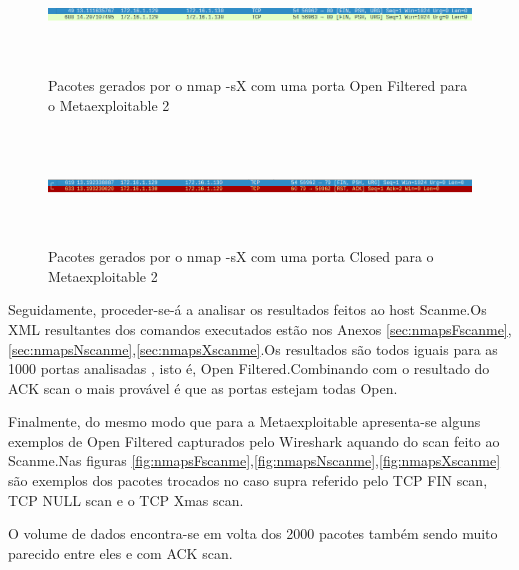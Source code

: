 \begin{figure}[h!]
	\centering
		
	\includegraphics[width=\textwidth,height=3cm,keepaspectratio]{images/nmapsXmetaOF.png}
		
	\caption{Pacotes gerados por o nmap -sX com uma porta Open Filtered para o Metaexploitable 2}
		
	\label{fig:nmapsXmetaOF}
\end{figure}

\begin{figure}[h!]
	\centering
		
	\includegraphics[width=\textwidth,height=3cm,keepaspectratio]{images/nmapsXmetaC.png}
		
	\caption{Pacotes gerados por o nmap -sX com uma porta Closed para o Metaexploitable 2}
		
	\label{fig:nmapsXmetaC}
\end{figure}

Seguidamente, proceder-se-á a analisar os resultados feitos ao host Scanme.Os XML resultantes dos comandos executados estão nos Anexos \ref{sec:nmapsFscanme},\ref{sec:nmapsNscanme},\ref{sec:nmapsXscanme}.Os resultados são todos iguais para as 1000 portas analisadas , isto é, Open Filtered.Combinando com o resultado do ACK scan o mais provável é que as portas estejam todas Open.

Finalmente, do mesmo modo que para a Metaexploitable apresenta-se alguns exemplos de Open Filtered capturados pelo Wireshark aquando do scan feito ao Scanme.Nas figuras \ref{fig:nmapsFscanme},\ref{fig:nmapsNscanme},\ref{fig:nmapsXscanme} são exemplos dos pacotes trocados no caso supra referido pelo TCP FIN scan, TCP NULL scan e o TCP Xmas scan.

O volume de dados encontra-se em volta dos 2000 pacotes também sendo muito parecido entre eles e com ACK scan.

